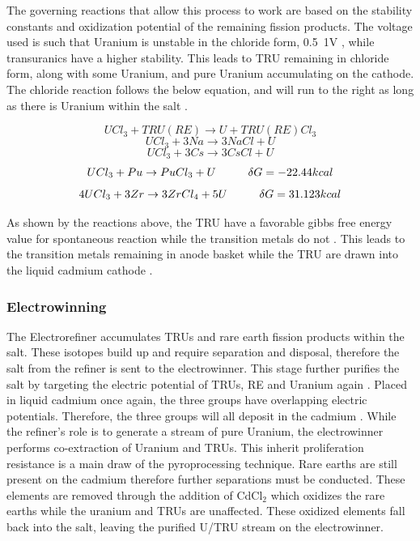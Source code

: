 The governing reactions that allow this process to work are based on the stability constants and oxidization potential of the remaining fission products.
The voltage used is such that Uranium is unstable in the chloride form, 0.5~1V \cite{organisation}, while transuranics have a higher stability. 
This leads to TRU remaining in chloride form, along with some Uranium, and pure Uranium accumulating on the cathode.
The chloride reaction follows the below equation, and will run to the right as long as there is Uranium within the salt \cite{organisation}.

\[ UCl_3+TRU(RE) \rightarrow U + TRU(RE)Cl_3 \]
\[ UCl_3 + 3Na \rightarrow 3NaCl + U \]
\[ UCl_3 + 3Cs \rightarrow 3CsCl + U \]
\[ UCl_3 + Pu \rightarrow PuCl_3 + U \hspace{10mm} \delta G = -22.44kcal \]
\[ 4UCl_3 + 3Zr \rightarrow 3ZrCl_4 + 5U \hspace{10mm} \delta G = 31.123kcal \]

As shown by the reactions above, the TRU have a favorable gibbs free energy value for spontaneous reaction while the transition metals do not \cite{supy}.
This leads to the transition metals remaining in anode basket while the TRU are drawn into the liquid cadmium cathode \cite{lee_korean_2011}.


\subsubsection{Electrowinning}
The Electrorefiner accumulates TRUs and rare earth fission products within the salt.
These isotopes build up and require separation and disposal, therefore the salt from the refiner is sent to the electrowinner.
This stage further purifies the salt by targeting the electric potential of TRUs, RE and Uranium again \cite{lee_korean_2011,organisation}.
Placed in liquid cadmium once again, the three groups have overlapping electric potentials.
Therefore, the three groups will all deposit in the cadmium \cite{lee_korean_2011}. 
While the refiner's role is to generate a stream of pure Uranium, the electrowinner performs co-extraction of Uranium and TRUs.
This inherit proliferation resistance is a main draw of the pyroprocessing technique.
Rare earths are still present on the cadmium therefore further separations must be conducted.
These elements are removed through the addition of CdCl$_2$ which oxidizes the rare earths while the uranium and TRUs are unaffected.
These oxidized elements fall back into the salt, leaving the purified U/TRU stream on the electrowinner.


